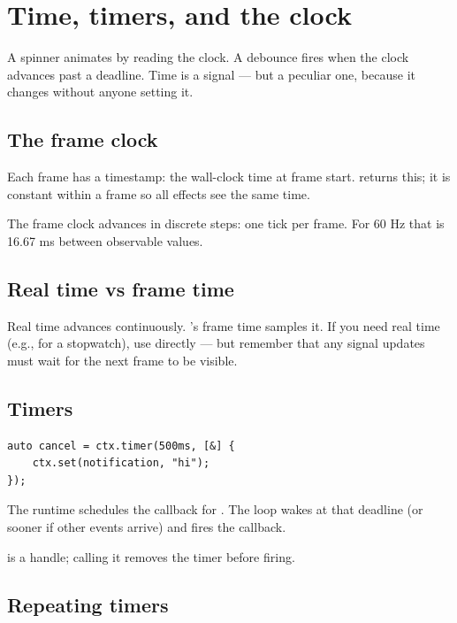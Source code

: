 \chapter{Time, timers, and the clock}
\label{ch:clocks}

\begin{aside}
A spinner animates by reading the clock. A debounce fires when
the clock advances past a deadline. Time is a signal --- but a
peculiar one, because it changes without anyone setting it.
\end{aside}

\section{The frame clock}

Each frame has a timestamp: the wall-clock time at frame
start.  returns this; it is constant within
a frame so all effects see the same time.

The frame clock advances in discrete steps: one tick per
frame. For 60 Hz that is 16.67 ms between observable values.

\section{Real time vs frame time}

Real time advances continuously. \maya{}'s frame time
samples it. If you need real time (e.g., for a stopwatch),
use  directly --- but
remember that any signal updates must wait for the next
frame to be visible.

\section{Timers}

\begin{lstlisting}
auto cancel = ctx.timer(500ms, [&] {
    ctx.set(notification, "hi");
});
\end{lstlisting}

The runtime schedules the callback for .
The loop wakes at that deadline (or sooner if other events
arrive) and fires the callback.

 is a handle; calling it removes the timer
before firing.

\section{Repeating timers}

